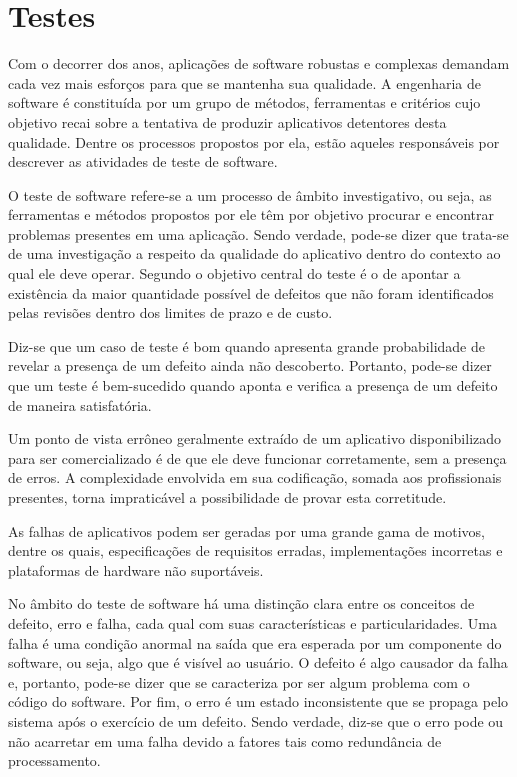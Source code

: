 \section{Testes}
Com o decorrer dos anos, aplicações de software robustas e complexas
 demandam cada vez mais esforços para que se mantenha sua qualidade. A
 engenharia de software é constituída por um grupo de métodos, ferramentas e
 critérios cujo objetivo recai sobre a tentativa de produzir aplicativos
 detentores desta qualidade. Dentre os processos propostos por ela, estão
 aqueles responsáveis por descrever as atividades de teste de software.
   
O teste de software refere-se a um processo de âmbito investigativo, ou
 seja, as ferramentas e métodos propostos  por ele têm por objetivo procurar
 e encontrar problemas presentes em  uma aplicação. Sendo verdade, pode-se
 dizer que trata-se de uma investigação a respeito da qualidade do
 aplicativo dentro do contexto ao qual ele deve operar. Segundo
 \cite{bib:pressman} o objetivo central do teste é o de apontar a existência
 da maior quantidade possível de defeitos que  não foram identificados pelas
 revisões dentro dos limites de prazo e de custo.

Diz-se que um caso de teste é bom quando apresenta grande probabilidade de
 revelar a presença de um defeito ainda não descoberto. Portanto, pode-se
 dizer que um teste é bem-sucedido quando aponta e verifica a presença de um
 defeito de maneira satisfatória.
 
Um ponto de vista errôneo geralmente extraído de um aplicativo
 disponibilizado para ser comercializado é de que ele deve funcionar
 corretamente, sem a presença de erros. A complexidade envolvida em sua
 codificação, somada aos profissionais presentes, torna impraticável a
 possibilidade de provar esta corretitude.
 
As falhas de aplicativos podem ser geradas por uma grande gama de motivos,
 dentre os quais, especificações de requisitos erradas, implementações
 incorretas e plataformas de hardware não suportáveis. 

No âmbito do teste de software há uma distinção clara entre os conceitos de
 defeito, erro e falha, cada qual com suas características e
 particularidades. Uma falha é uma condição anormal na saída que era
 esperada por um componente do software, ou seja, algo que é visível ao
 usuário. O defeito é algo causador da falha e, portanto, pode-se dizer que
 se caracteriza por ser algum problema com o código do software. Por fim, o
 erro é um estado inconsistente que se propaga pelo sistema após o exercício
 de um defeito. Sendo verdade, diz-se que o erro pode ou não acarretar em
 uma falha devido a fatores tais como redundância de processamento.

